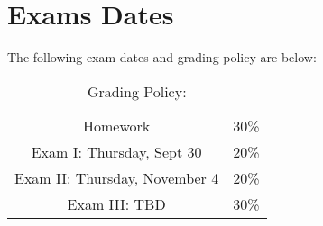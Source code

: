 \documentclass[11pt]{article}
\begin{document}
\section{Exams Dates} 
The following exam dates and grading policy are below:

\begin{table}[h!]
\caption{Grading Policy:}
\begin{center}
\begin{tabular}{cc}
Homework &30\%\\
Exam I:  Thursday, Sept 30 &20\%\\
Exam  II: Thursday, November 4 & 20\%\\
Exam III:  TBD & 30\%\\
\end{tabular}
\end{center}
\label{default}
\end{table}%
\end{document}
